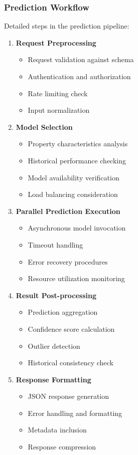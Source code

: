 \documentclass[12pt,a4paper]{report}
\begin{document}
\subsubsection{Prediction Workflow}
Detailed steps in the prediction pipeline:

\begin{enumerate}
    \item \textbf{Request Preprocessing}
    \begin{itemize}
        \item Request validation against schema
        \item Authentication and authorization
        \item Rate limiting check
        \item Input normalization
    \end{itemize}
    
    \item \textbf{Model Selection}
    \begin{itemize}
        \item Property characteristics analysis
        \item Historical performance checking
        \item Model availability verification
        \item Load balancing consideration
    \end{itemize}
    
    \item \textbf{Parallel Prediction Execution}
    \begin{itemize}
        \item Asynchronous model invocation
        \item Timeout handling
        \item Error recovery procedures
        \item Resource utilization monitoring
    \end{itemize}
    
    \item \textbf{Result Post-processing}
    \begin{itemize}
        \item Prediction aggregation
        \item Confidence score calculation
        \item Outlier detection
        \item Historical consistency check
    \end{itemize}
    
    \item \textbf{Response Formatting}
    \begin{itemize}
        \item JSON response generation
        \item Error handling and formatting
        \item Metadata inclusion
        \item Response compression
    \end{itemize}
\end{enumerate}
\end{document}
